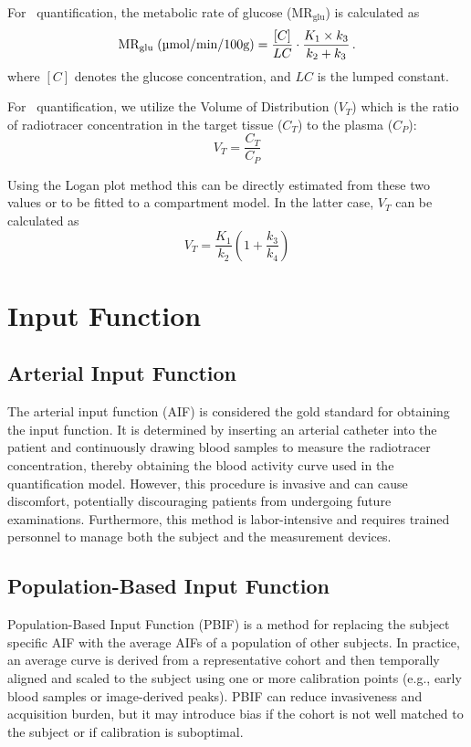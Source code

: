 For \fdg$\,$ quantification, the metabolic rate of glucose (\(\textrm{MR}_{\textrm{glu}}\)) is calculated as
\begin{equation}
	\textrm{MR}_{\textrm{glu}} \; (\textrm{\textmu mol/min/100g}) = \frac{[C]}{LC} \cdot \frac{K_1 \times k_3}{k_2 + k_3} \,.
\end{equation}
where \([C]\) denotes the glucose concentration, and \(LC\) is the lumped constant.

For \yohimbine $\,$ quantification, we utilize the Volume of Distribution ($V_T$) which is the ratio of radiotracer concentration in the target tissue ($C_T$) to the plasma ($C_P$):
\[
	V_T = \frac{C_T}{C_P}
\]

Using the Logan plot method this can be directly estimated from these two values or to be fitted to a compartment model.
In the latter case, $V_T$ can be calculated as
\[
	V_T = \frac{K_1}{k_2} (1+\frac{k_3}{k_4})
\]

\section{Input Function}

\subsection{Arterial Input Function}
The arterial input function (AIF) is considered the gold standard for obtaining the input function.
It is determined by inserting an arterial catheter into the patient and continuously drawing blood samples to measure the radiotracer concentration, thereby obtaining the blood activity curve used in the quantification model.
However, this procedure is invasive and can cause discomfort, potentially discouraging patients from undergoing future examinations.
Furthermore, this method is labor-intensive and requires trained personnel to manage both the subject and the measurement devices.

\subsection{Population-Based Input Function}
Population-Based Input Function (PBIF) is a method for replacing the subject specific AIF with the average AIFs of a population of other subjects.
In practice, an average curve is derived from a representative cohort and then temporally aligned and scaled to the subject using one or more calibration points (e.g., early blood samples or image-derived peaks).
PBIF can reduce invasiveness and acquisition burden, but it may introduce bias if the cohort is not well matched to the subject or if calibration is suboptimal.

